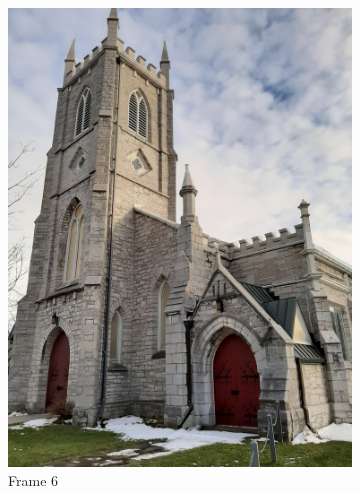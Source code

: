 \documentclass[conference]{IEEEtran}
\begin{document}
\begin{figure}[!h]
\begin{subfigure}[b]{0.2\linewidth}
    \includegraphics[width=\linewidth, angle = -90]{images/frame6.jpg}
    \caption{Frame 6}
  \end{subfigure}
  \begin{subfigure}[b]{0.2\linewidth}

\end{subfigure}
\end{figure}
\end{document}
